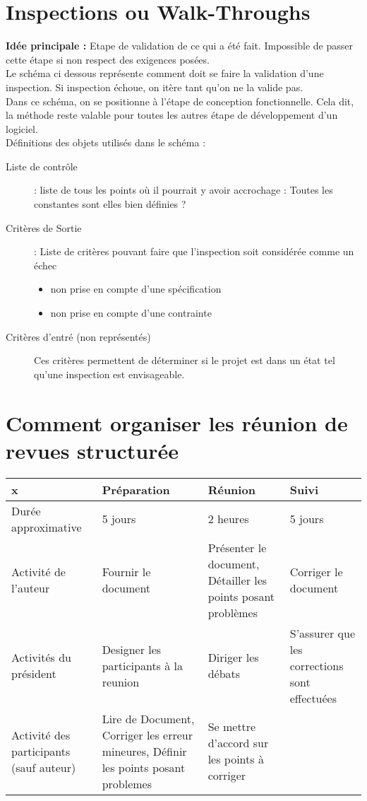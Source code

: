 \section{Inspections ou Walk-Throughs}

\textbf{Idée principale :} Etape de validation de ce qui a été fait. Impossible de passer cette étape si non respect des exigences posées.\\

Le schéma ci dessous représente comment doit se faire la validation d’une inspection. Si inspection échoue, on itère tant qu’on ne la valide pas.\\

Dans ce schéma, on se positionne à l’étape de conception fonctionnelle. Cela dit, la méthode reste valable pour toutes les autres étape de développement d’un logiciel.\\

Définitions des objets utilisés dans le schéma :
\begin{description}
\item[Liste de contrôle] : liste de tous les points où il pourrait y avoir accrochage : Toutes les constantes sont elles bien définies ?
\item [Critères de Sortie] : Liste de critères pouvant faire que l’inspection soit considérée comme un échec
	\begin{itemize}
	\item non prise en compte d'une spécification
	\item non prise  en compte d'une contrainte
	\end{itemize}
\item[Critères d’entré (non représentés)] Ces critères permettent de déterminer si le projet est dans un état tel qu’une inspection est envisageable.
\end{description}


\section{Comment organiser les réunion de revues structurée}

\begin{tabular}{|p{2.5cm}|p{2.5cm}|p{2.5cm}|p{2.5cm}|}
\hline
 x & Préparation & Réunion & Suivi\\
\hline
Durée approximative & 5 jours & 2 heures & 5 jours\\
\hline
Activité de l’auteur & Fournir le document & Présenter le document, Détailler les points posant problèmes & Corriger le document\\
\hline 
Activités du président & Designer les participants à la reunion & Diriger les débats & S’assurer que les corrections sont effectuées\\
\hline 
Activité des participants (sauf auteur)	& Lire de Document, Corriger les erreur mineures, Définir les points posant problemes & Se mettre d’accord sur les points à corriger &\\
\hline
\end{tabular}


